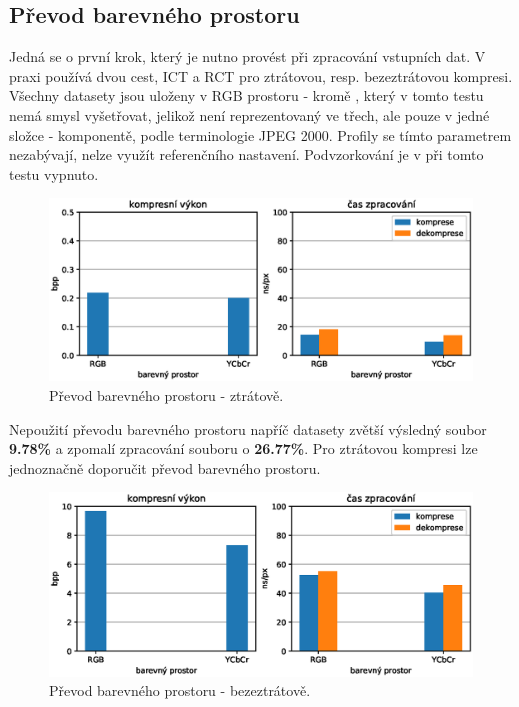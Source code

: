 \subsection*{Převod barevného prostoru}
Jedná se o první krok, který je nutno provést při zpracování vstupních dat. V praxi používá dvou cest, ICT a RCT pro ztrátovou, resp. bezeztrátovou kompresi. Všechny datasety jsou uloženy v RGB prostoru - kromě , který v tomto testu nemá smysl vyšetřovat, jelikož není reprezentovaný ve třech, ale pouze v jedné složce - komponentě, podle terminologie JPEG 2000. Profily se tímto parametrem nezabývají, nelze využít referenčního nastavení. Podvzorkování je v při tomto testu vypnuto.
\newline

\begin{figure}[hbt!]
  \centering
  \hspace*{-0.75cm}
  \includegraphics[width=16cm]{obrazky-figures/rgb_ycrcb/fotky_rgb_ycrcb.eps}
  \caption{Převod barevného prostoru - ztrátově.}
\end{figure}

\indent Nepoužití převodu barevného prostoru napříč datasety zvětší výsledný soubor \textbf{9.78\%} a zpomalí zpracování souboru o \textbf{26.77\%}. Pro ztrátovou kompresi lze jednoznačně doporučit převod barevného prostoru.
\clearpage
\begin{figure}[hbt!]
  \centering
  \hspace*{-0.75cm}
  \includegraphics[width=16cm]{obrazky-figures/rgb_ycrcb/fotky_full_rgb_ycrcb.eps}
  \caption{Převod barevného prostoru - bezeztrátově.}
\end{figure}

